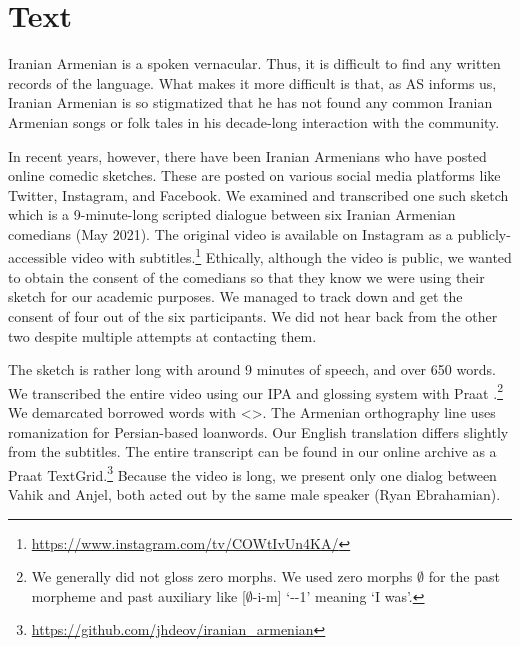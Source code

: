 \chapter{Text}\label{chapter:text}

Iranian Armenian is a spoken vernacular. Thus, it is difficult to find any written records of the language. What makes it more difficult is that, as AS informs us, Iranian Armenian is so stigmatized that he has not found any common Iranian Armenian songs or folk tales in his decade-long interaction with the community. 

In recent years, however, there have been Iranian Armenians who have posted online comedic sketches. These are posted on various social media platforms like Twitter, Instagram, and Facebook. We examined and transcribed one such sketch which is a 9-minute-long scripted dialogue between six Iranian Armenian comedians (May 2021). The original video  is available on Instagram as a publicly-accessible video with subtitles.\footnote{\url{https://www.instagram.com/tv/COWtIvUn4KA/}} Ethically, although the video is public, we wanted to obtain the consent of the comedians so that they know we were using their sketch for our academic purposes. We managed to track down and get the consent of four out of the six participants. We did not hear back from the other two despite multiple attempts at contacting them. 

The sketch is rather long with around 9 minutes of speech, and over 650 words.  We transcribed the entire video using our IPA and glossing system with Praat \cite{boersma-2001-praat}.\footnote{We generally did not gloss zero morphs. We used zero morphs $\emptyset$   for the past morpheme and past auxiliary like [$\emptyset$-i-m] `{\auxgloss}-{\pst}-1{\sg}' meaning `I was'.}
 We demarcated borrowed words with <>. The Armenian orthography  line uses romanization for Persian-based loanwords. Our English translation differs slightly from the subtitles.  The entire transcript can be found in our online archive as a Praat TextGrid.\footnote{\url{https://github.com/jhdeov/iranian_armenian}} Because the video is long, we present  only one dialog between Vahik and Anjel, both acted out by the same male speaker (Ryan Ebrahamian).\largerpage[-2]\pagebreak


